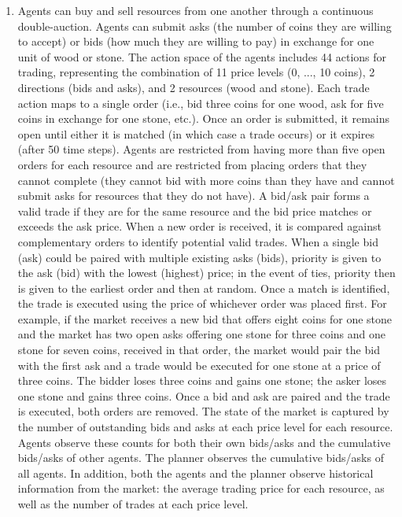 \documentclass{article}
\begin{document}
\begin{enumerate}
	\item Agents can buy and sell resources from one another through a continuous double-auction. Agents can submit asks (the number of coins they are willing to accept) or bids (how much they are willing to pay) in exchange for one unit of wood or stone. The action space of the agents includes 44 actions for trading, representing the combination of 11 price levels (0, ..., 10 coins), 2 directions (bids and asks), and 2 resources (wood and stone). Each trade action maps to a single order (i.e., bid three coins for one wood, ask for five coins in exchange for one stone, etc.). Once an order is submitted, it remains open until either it is matched (in which case a trade occurs) or it expires (after 50 time steps). Agents are restricted from having more than five open orders for each resource and are restricted from placing orders that they cannot complete (they cannot bid with more coins than they have and cannot submit asks for resources that they do not have). A bid/ask pair forms a valid trade if they are for the same resource and the bid price matches or exceeds the ask price. When a new order is received, it is compared against complementary orders to identify potential valid trades. When a single bid (ask) could be paired with multiple existing asks (bids), priority is given to the ask (bid) with the lowest (highest) price; in the event of ties, priority then is given to the earliest order and then at random. Once a match is identified, the trade is executed using the price of whichever order was placed first. For example, if the market receives a new bid that offers eight coins for one stone and the market has two open asks offering one stone for three coins and one stone for seven coins, received in that order, the market would pair the bid with the first ask and a trade would be executed for one stone at a price of three coins. The bidder loses three coins and gains one stone; the asker loses one stone and gains three coins. Once a bid and ask are paired and the trade is executed, both orders are removed. The state of the market is captured by the number of outstanding bids and asks at each price level for each resource. Agents observe these counts for both their own bids/asks and the cumulative bids/asks of other agents. The planner observes the cumulative bids/asks of all agents. In addition, both the agents and the planner observe historical information from the market: the average trading price for each resource, as well as the number of trades at each price level.
	

\end{enumerate}
\end{document}
